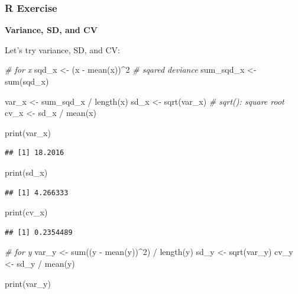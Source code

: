 \documentclass[
]{article}
\newenvironment{Shaded}{\begin{snugshade}}{\end{snugshade}}
\newcommand{\CommentTok}[1]{\textcolor[rgb]{0.56,0.35,0.01}{\textit{#1}}}
\newcommand{\DecValTok}[1]{\textcolor[rgb]{0.00,0.00,0.81}{#1}}
\newcommand{\FunctionTok}[1]{\textcolor[rgb]{0.00,0.00,0.00}{#1}}
\newcommand{\NormalTok}[1]{#1}
\newcommand{\OtherTok}[1]{\textcolor[rgb]{0.56,0.35,0.01}{#1}}
\newcommand{\SpecialCharTok}[1]{\textcolor[rgb]{0.00,0.00,0.00}{#1}}
\begin{document}
\hypertarget{r-exercise-1}{%
\subsubsection{R Exercise}\label{r-exercise-1}}

\textbf{Variance, SD, and CV}

Let's try variance, SD, and CV:

\begin{Shaded}
\begin{Highlighting}[]
\CommentTok{\# for x}
\NormalTok{sqd\_x }\OtherTok{\textless{}{-}}\NormalTok{ (x }\SpecialCharTok{{-}} \FunctionTok{mean}\NormalTok{(x))}\SpecialCharTok{\^{}}\DecValTok{2} \CommentTok{\# sqared deviance}
\NormalTok{sum\_sqd\_x }\OtherTok{\textless{}{-}} \FunctionTok{sum}\NormalTok{(sqd\_x)}

\NormalTok{var\_x }\OtherTok{\textless{}{-}}\NormalTok{ sum\_sqd\_x }\SpecialCharTok{/} \FunctionTok{length}\NormalTok{(x)}
\NormalTok{sd\_x }\OtherTok{\textless{}{-}} \FunctionTok{sqrt}\NormalTok{(var\_x) }\CommentTok{\# sqrt(): square root}
\NormalTok{cv\_x }\OtherTok{\textless{}{-}}\NormalTok{ sd\_x }\SpecialCharTok{/} \FunctionTok{mean}\NormalTok{(x)}

\FunctionTok{print}\NormalTok{(var\_x)}
\end{Highlighting}
\end{Shaded}

\begin{verbatim}
## [1] 18.2016
\end{verbatim}

\begin{Shaded}
\begin{Highlighting}[]
\FunctionTok{print}\NormalTok{(sd\_x)}
\end{Highlighting}
\end{Shaded}

\begin{verbatim}
## [1] 4.266333
\end{verbatim}

\begin{Shaded}
\begin{Highlighting}[]
\FunctionTok{print}\NormalTok{(cv\_x)}
\end{Highlighting}
\end{Shaded}

\begin{verbatim}
## [1] 0.2354489
\end{verbatim}

\begin{Shaded}
\begin{Highlighting}[]
\CommentTok{\# for y}
\NormalTok{var\_y }\OtherTok{\textless{}{-}} \FunctionTok{sum}\NormalTok{((y }\SpecialCharTok{{-}} \FunctionTok{mean}\NormalTok{(y))}\SpecialCharTok{\^{}}\DecValTok{2}\NormalTok{) }\SpecialCharTok{/} \FunctionTok{length}\NormalTok{(y)}
\NormalTok{sd\_y }\OtherTok{\textless{}{-}} \FunctionTok{sqrt}\NormalTok{(var\_y)}
\NormalTok{cv\_y }\OtherTok{\textless{}{-}}\NormalTok{ sd\_y }\SpecialCharTok{/} \FunctionTok{mean}\NormalTok{(y)}

\FunctionTok{print}\NormalTok{(var\_y)}
\end{Highlighting}
\end{Shaded}
\end{document}
